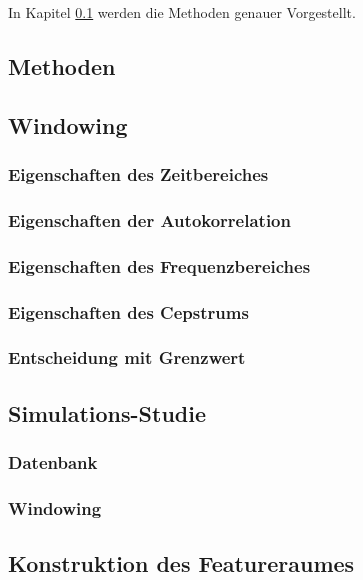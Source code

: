 In Kapitel \ref{sec:methods_vad_new} werden die Methoden genauer Vorgestellt. 


\subsection{Methoden}
\label{sec:methods_vad_new}

\subsection{Windowing}

\subsubsection{Eigenschaften des Zeitbereiches}

\subsubsection{Eigenschaften der Autokorrelation}

\subsubsection{Eigenschaften des Frequenzbereiches}

\subsubsection{Eigenschaften des Cepstrums}

\subsubsection{Entscheidung mit Grenzwert}

\subsection{Simulations-Studie}

\subsubsection{Datenbank}

\subsubsection{Windowing}

\subsection{Konstruktion des Featureraumes}

